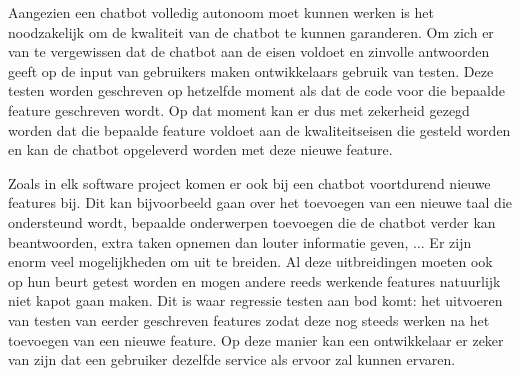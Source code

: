 Aangezien een chatbot volledig autonoom moet kunnen werken is het noodzakelijk om de kwaliteit van de chatbot te kunnen garanderen. Om zich er van te vergewissen dat de chatbot aan de eisen voldoet en zinvolle antwoorden geeft op de input van gebruikers maken ontwikkelaars gebruik van testen. Deze testen worden geschreven op hetzelfde moment als dat de code voor die bepaalde feature geschreven wordt. Op dat moment kan er dus met zekerheid gezegd worden dat die bepaalde feature voldoet aan de kwaliteitseisen die gesteld worden en kan de chatbot opgeleverd worden met deze nieuwe feature. 

Zoals in elk software project komen er ook bij een chatbot voortdurend nieuwe features bij. Dit kan bijvoorbeeld gaan over het toevoegen van een nieuwe taal die ondersteund wordt, bepaalde onderwerpen toevoegen die de chatbot verder kan beantwoorden, extra taken opnemen dan louter informatie geven, ... Er zijn enorm veel mogelijkheden om uit te breiden. Al deze uitbreidingen moeten ook op hun beurt getest worden en mogen andere reeds werkende features natuurlijk niet kapot gaan maken. Dit is waar regressie testen aan bod komt: het uitvoeren van testen van eerder geschreven features zodat deze nog steeds werken na het toevoegen van een nieuwe feature. Op deze manier kan een ontwikkelaar er zeker van zijn dat een gebruiker dezelfde service als ervoor zal kunnen ervaren.


%